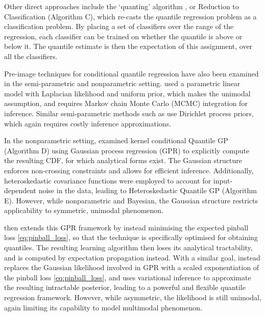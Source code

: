 \documentclass[twoside]{article} \usepackage{aistats2017}
\theoremstyle{definition}
\theoremstyle{theorem}
\begin{document}
	Other direct approaches include the `quanting' algorithm \citep{langford2012predicting}, or Reduction to Classification (Algorithm C), which re-casts the quantile regression problem as a classification problem. By placing a set of classifiers over the range of the regression, each classifier can be trained on whether the quantile is above or below it. The quantile estimate is then the expectation of this assignment, over all the classifiers.

	Pre-image techniques for conditional quantile regression have also been examined in the semi-parametric and nonparametric setting. \cite{yu2001bayesian} used a parametric linear model with Laplacian likelihood and uniform prior, which makes the unimodal assumption, and requires Markov chain Monte Carlo (MCMC) integration for inference. Similar semi-parametric methods such as \cite{hjort2007nonparametric, hjort2009quantile} use Dirichlet process priors, which again requires costly inference approximations.
	
	In the nonparametric setting, \cite{quadrianto2009kernel} examined kernel conditional Quantile GP (Algorithm D) using Gaussian process regression (GPR) to explicitly compute the resulting CDF, for which analytical forms exist. The Gaussian structure enforces non-crossing constraints and allows for efficient inference. Additionally, heteroskedastic covariance functions were employed to account for input-dependent noise in the data, leading to Heteroskedastic Quantile GP (Algorithm E). However, while nonparametric and Bayesian, the Gaussian structure restricts applicability to symmetric, unimodal phenomenon.
	
	\cite{boukouvalas2012gaussian} then extends this GPR framework by instead minimising the expected pinball loss \eqref{eq:pinball_loss}, so that the technique is specifically optimised for obtaining quantiles. The resulting learning algorithm then loses its analytical tractability, and is computed by expectation propagation instead. With a similar goal, \cite{abeywardana2015variational} instead replaces the Gaussian likelihood involved in GPR with a scaled exponentiation of the pinball loss \eqref{eq:pinball_loss}, and uses variational inference to approximate the resulting intractable posterior, leading to a powerful and flexible quantile regression framework. However, while asymmetric, the likelihood is still unimodal, again limiting its capability to model multimodal phenomenon.
	 
	
\end{document}
